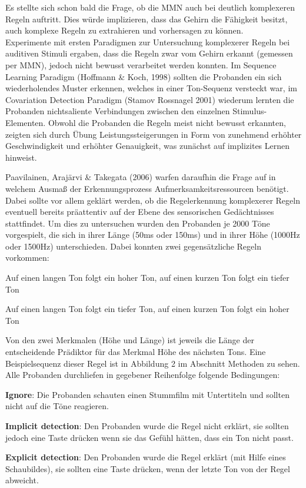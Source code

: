 \documentclass[doc,a4paper,12pt]{apa6}
\begin{document}
Es stellte sich schon bald die Frage, ob die MMN auch bei deutlich komplexeren Regeln auftritt. Dies würde implizieren, dass das Gehirn die Fähigkeit besitzt, auch komplexe Regeln zu extrahieren und vorhersagen zu können.\\
Experimente mit ersten Paradigmen zur Untersuchung komplexerer Regeln bei auditiven Stimuli ergaben, dass die Regeln zwar vom Gehirn erkannt (gemessen per MMN), jedoch nicht bewusst verarbeitet werden konnten. Im Sequence Learning Paradigm (Hoffmann \& Koch, 1998) sollten die Probanden ein sich wiederholendes Muster erkennen, welches in einer Ton-Sequenz versteckt war, im Covariation Detection Paradigm (Stamov Rossnagel 2001) wiederum lernten die Probanden nichtsaliente Verbindungen zwischen den einzelnen Stimulus-Elementen. Obwohl die Probanden die Regeln meist nicht bewusst erkannten, zeigten sich durch Übung Leistungssteigerungen in Form von zunehmend erhöhter Geschwindigkeit und erhöhter Genauigkeit, was zunächst auf implizites Lernen hinweist.

Paavilainen, Arajärvi \& Takegata (2006) warfen daraufhin die Frage auf in welchem Ausmaß der Erkennungsprozess Aufmerksamkeitsressourcen benötigt. Dabei sollte vor allem geklärt werden, ob die Regelerkennung komplexerer Regeln eventuell bereits präattentiv auf der Ebene des sensorischen Gedächtnisses stattfindet. Um dies zu untersuchen wurden den Probanden je 2000 Töne vorgespielt, die sich in ihrer Länge (50ms oder 150ms) und in ihrer Höhe (1000Hz oder 1500Hz) unterschieden. Dabei konnten zwei gegensätzliche Regeln vorkommen:

\begin{compactitem}
  \item Auf einen langen Ton folgt ein hoher Ton, auf einen kurzen Ton folgt ein tiefer
Ton
  \item Auf einen langen Ton folgt ein tiefer Ton, auf einen kurzen Ton folgt ein hoher
Ton
\end{compactitem}

Von den zwei Merkmalen (Höhe und Länge) ist jeweils die Länge der entscheidende Prädiktor für das Merkmal Höhe des nächsten Tons. Eine Beispielsequenz dieser Regel ist in Abbildung 2 im Abschnitt Methoden zu sehen.\\
Alle Probanden durchliefen in gegebener Reihenfolge folgende Bedingungen:

\begin{compactitem}
  \item \textbf{Ignore}: Die Probanden schauten einen Stummfilm mit Untertiteln und sollten nicht auf die Töne reagieren.
  \item \textbf{Implicit detection}: Den Probanden wurde die Regel nicht erklärt, sie sollten jedoch eine Taste drücken wenn sie das Gefühl hätten, dass ein Ton nicht passt.
  \item \textbf{Explicit detection}: Den Probanden wurde die Regel erklärt (mit Hilfe eines Schaubildes), sie sollten eine Taste drücken, wenn der letzte Ton von der Regel abweicht.
\end{compactitem}
\end{document}
